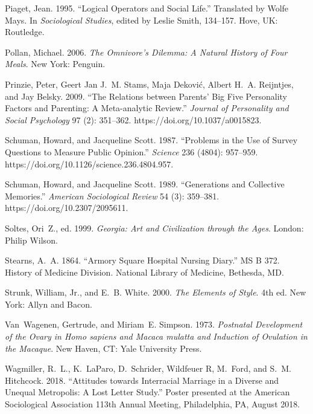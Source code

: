 \documentclass[]{interact}
\theoremstyle{plain}%
\theoremstyle{definition}
\theoremstyle{remark}
\begin{document}
\begin{thebibliography}{}
Piaget, Jean. 1995. ``Logical Operators and Social Life.'' Translated by Wolfe
Mays. In \emph{Sociological Studies},  edited by Leslie Smith, 134--157.
Hove, UK: Routledge.

Pollan, Michael. 2006. \emph{The Omnivore's Dilemma: A Natural History of Four
	Meals}. New York: Penguin.

Prinzie, Peter, Geert Jan J.~M. Stams, Maja Dekovi{\'c}, Albert H.~A.
Reijntjes, and Jay Belsky. 2009. ``The Relations between Parents' Big Five
Personality Factors and Parenting: A Meta-analytic Review.'' \emph{Journal of
	Personality and Social Psychology} 97 (2): 351--362.
https://doi.org/{10.1037/a0015823}.

Schuman, Howard, and Jacqueline Scott. 1987. ``Problems in the Use of Survey
Questions to Measure Public Opinion.'' \emph{Science} 236 (4804): 957--959.
https://doi.org/{10.1126/science.236.4804.957}.

Schuman, Howard, and Jacqueline Scott. 1989. ``Generations and Collective
Memories.'' \emph{American Sociological Review} 54 (3): 359--381.
https://doi.org/{10.2307/2095611}.

Soltes, Ori~Z., ed. 1999. \emph{Georgia: Art and Civilization through the
	Ages}. London: Philip Wilson.

Stearns, A.~A. 1864. ``Armory {S}quare {H}ospital Nursing Diary.'' MS B 372.
History of Medicine Division. National Library of Medicine, Bethesda, MD.

Strunk, William, Jr., and E.~B. White. 2000. \emph{The Elements of Style}. 4th
ed. New York: Allyn and Bacon.

Van~Wagenen, Gertrude, and Miriam~E. Simpson. 1973. \emph{Postnatal Development
	of the Ovary in \emph{Homo sapiens} and \emph{Macaca mulatta} and Induction
	of Ovulation in the Macaque}. New Haven, CT: Yale University Press.

Wagmiller, R.~L., K.~LaParo, D.~Schrider, Wildfeuer R, M.~Ford, and S.~M.
Hitchcock. 2018. ``Attitudes towards Interracial Marriage in a Diverse and
Unequal Metropolis: A Lost Letter Study.'' Poster presented at the American
Sociological Association 113th Annual Meeting, Philadelphia, PA, August
2018.


\end{thebibliography}
\end{document}
